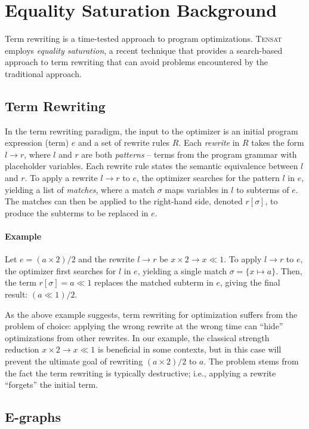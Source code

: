 \documentclass{article}
\newcommand{\ourname}[0]{\textsc{Tensat}}
\begin{document}
\section{Equality Saturation Background}\label{sec:esat}

Term rewriting is a time-tested approach to program optimizations.
\ourname{} employs \textit{equality saturation},
a recent technique that provides a search-based approach 
to term rewriting that can avoid problems encountered by the traditional approach.

\subsection{Term Rewriting}
In the term rewriting paradigm, the input to the optimizer is an initial program expression (term) $e$
and a set of rewrite rules $R$.
Each \emph{rewrite} in $R$ takes the form $l \to r$, where $l$ and $r$ are both \emph{patterns} -- terms from the program grammar with placeholder variables.
Each rewrite rule states the semantic equivalence between $l$ and $r$.
To apply a rewrite $l \to r$ to $e$, the optimizer searches for the pattern $l$ in $e$, 
yielding a list of \emph{matches}, where a 
match $\sigma$ maps variables in $l$ to subterms of $e$.
The matches can then be applied to the right-hand side, denoted $r[\sigma]$, to produce the subterms to be replaced in $e$.

\paragraph{Example} Let $e = (a \times 2) / 2$ and the rewrite $l \to r$ be $x \times 2 \to x \ll 1$.
To apply $l \to r$ to $e$, the optimizer first searches for $l$ in $e$, 
yielding a single match $\sigma = \{x \mapsto a\}$.
Then, the term $r[\sigma] = a \ll 1$ replaces the matched subterm in $e$,
giving the final result: $(a \ll 1) / 2$.

As the above example suggests, term rewriting for optimization suffers from the problem of choice: 
applying the wrong rewrite at the wrong time can ``hide'' optimizations from other rewrites.
In our example, the classical strength reduction $x \times 2 \to x \ll 1$ is beneficial in some contexts,
but in this case will prevent the ultimate goal of rewriting $(a \times 2) / 2$ to $a$.
The problem stems from the fact the term rewriting is typically destructive; 
i.e., applying a rewrite ``forgets'' the initial term.

\subsection{E-graphs}
\end{document}
